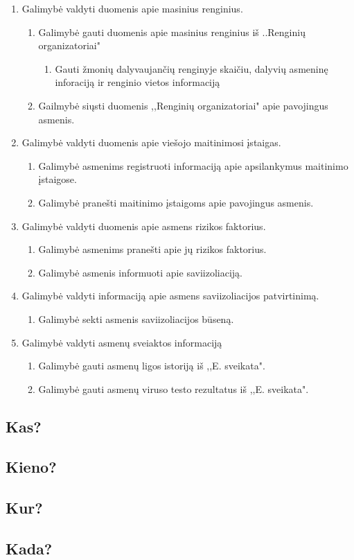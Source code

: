\documentclass{VUMIFPSkursinis}
\begin{document}
\begin{enumerate}
\begin{enumerate}
\begin{enumerate}
					\end{enumerate}
			\end{enumerate}
		\item{Galimybė valdyti duomenis apie masinius renginius.}
			\begin{enumerate}
				\item{Galimybė gauti duomenis apie masinius renginius iš ..Renginių organizatoriai"}
					\begin{enumerate}
						\item{Gauti žmonių dalyvaujančių renginyje skaičiu, dalyvių asmeninę inforaciją ir renginio vietos informaciją}
					\end{enumerate}
				\item{Gailmybė siųsti duomenis ,,Renginių organizatoriai" apie pavojingus asmenis.}
			\end{enumerate}
		\item{Galimybė valdyti duomenis apie viešojo maitinimosi įstaigas.}
			\begin{enumerate}
				\item{Galimybė asmenims registruoti informaciją apie apsilankymus maitinimo įstaigose.}
				\item{Galimybė pranešti maitinimo įstaigoms apie pavojingus asmenis.}
			\end{enumerate}
		\item{Galimybė valdyti duomenis apie asmens rizikos faktorius.}
			\begin{enumerate}
				\item{Galimybė asmenims pranešti apie jų rizikos faktorius.}
				\item{Galimybė asmenis informuoti apie saviizoliaciją.}
			\end{enumerate}
		\item{Galimybė valdyti informaciją apie asmens saviizoliacijos patvirtinimą.}
			\begin{enumerate}
				\item{Galimybė sekti asmenis saviizoliacijos būseną.}
			\end{enumerate}
		\item{Galimybė valdyti asmenų sveiaktos informaciją}
			\begin{enumerate}
				\item{Galimybė gauti asmenų ligos istoriją iš ,,E. sveikata".}
				\item{Galimybė gauti asmenų viruso testo rezultatus iš ,,E. sveikata".}
			\end{enumerate}
	\end{enumerate}

\subsection{Kas?}

\subsection{Kieno?}

\subsection{Kur?}

\subsection{Kada?}
\end{document}
